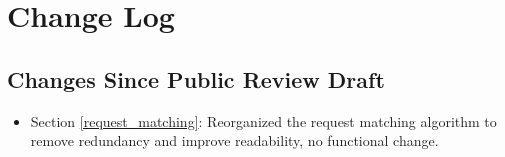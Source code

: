 \chapter{Change Log}

\section{Changes Since Public Review Draft}

\begin{itemize}
\item Section \ref{request_matching}: Reorganized the request matching algorithm to remove redundancy and improve readability, no functional change. 
\end{itemize}